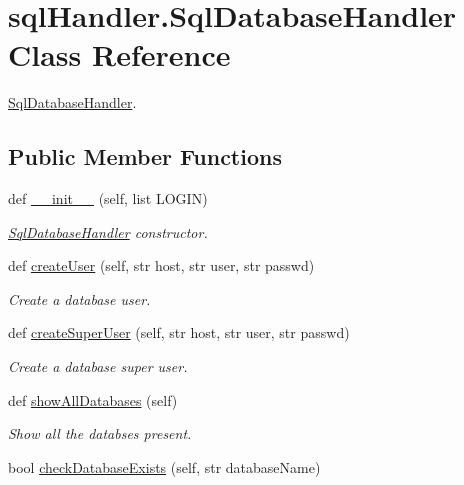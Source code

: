 \hypertarget{classsql_handler_1_1_sql_database_handler}{}\section{sql\+Handler.\+Sql\+Database\+Handler Class Reference}
\label{classsql_handler_1_1_sql_database_handler}


\mbox{\hyperlink{classsql_handler_1_1_sql_database_handler}{Sql\+Database\+Handler}}.  


\subsection*{Public Member Functions}
\begin{DoxyCompactItemize}
\item 
def \mbox{\hyperlink{classsql_handler_1_1_sql_database_handler_aff05f8cdf5dc7abaf85ea55df8f1fb90}{\+\_\+\+\_\+init\+\_\+\+\_\+}} (self, list L\+O\+G\+IN)
\begin{DoxyCompactList}\small\item\em \mbox{\hyperlink{classsql_handler_1_1_sql_database_handler}{Sql\+Database\+Handler}} constructor. \end{DoxyCompactList}\item 
def \mbox{\hyperlink{classsql_handler_1_1_sql_database_handler_abbe8274ab761bc4a1079f88f15d01a58}{create\+User}} (self, str host, str user, str passwd)
\begin{DoxyCompactList}\small\item\em Create a database user. \end{DoxyCompactList}\item 
def \mbox{\hyperlink{classsql_handler_1_1_sql_database_handler_a51ac6215f01ef3deddc74ee0880858b2}{create\+Super\+User}} (self, str host, str user, str passwd)
\begin{DoxyCompactList}\small\item\em Create a database super user. \end{DoxyCompactList}\item 
def \mbox{\hyperlink{classsql_handler_1_1_sql_database_handler_a4a3a7c209ded4c59d34373b5d39f7b01}{show\+All\+Databases}} (self)
\begin{DoxyCompactList}\small\item\em Show all the databses present. \end{DoxyCompactList}\item 
bool \mbox{\hyperlink{classsql_handler_1_1_sql_database_handler_ac9f54dee141b8b162f459f99393ef888}{check\+Database\+Exists}} (self, str database\+Name)

\end{DoxyCompactItemize}

